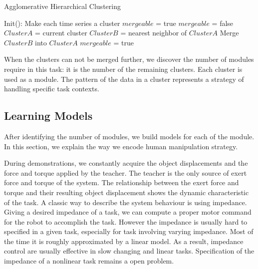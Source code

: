 \documentclass[preprint,12pt]{elsarticle}
\begin{document}
\begin{algorithm}
  \caption{Agglomerative Hierarchical Clustering}
  \begin{algorithmic}[1]
    \State Init(): Make each time series a cluster\;
    \State $mergeable$ = true\;
      \State $mergeable$ = false\;
        \State $ClusterA$ = current cluster\;
        \State $ClusterB$ = nearest neighbor of $ClusterA$\;
            \State Merge $ClusterB$ into $ClusterA$\;
            \State $mergeable$ = true\;
        \EndIf
      \EndFor
    \EndWhile
    \EndFunction
  \end{algorithmic}
  \label{code:cluster}
\end{algorithm}



When the clusters can not be merged further, we discover the number of modules require in this task: it is the number of the remaining clusters. Each cluster is used as a module. The pattern of the data in a cluster represents a strategy of handling specific task contexts.

\subsection{Learning Models}
\label{sec:model}
After identifying the number of modules, we build models for each of the module. In this section, we explain the way we encode human manipulation strategy.

During demonstrations, we constantly acquire the object displacements and the force and torque applied by the teacher. The teacher is the only source of exert force and torque of the system. The relationship between the exert force and torque and their resulting object displacement shows the dynamic characteristic of the task. A classic way to describe the system behaviour is using impedance. Giving a desired impedance of a task, we can compute a proper motor command for the robot to accomplish the task. %
However the impedance is usually hard to specified in a given task, especially for task involving varying impedance. Most of the time it is roughly approximated by a linear model. As a result, impedance control are usually effective in slow changing and linear tasks. Specification of the impedance of a nonlinear task remains a open problem.
\end{document}
